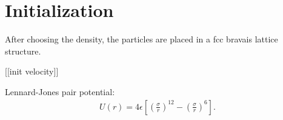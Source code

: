 \section{Initialization}
After choosing the density, the particles are placed in a fcc bravais lattice structure.

[[init velocity]]

Lennard-Jones pair potential:
\begin{gather*}
    U(r) = 4\epsilon\left[\left(\frac{\sigma}{r}\right)^{12}-\left(\frac{\sigma}{r}\right)^6\right].
\end{gather*}